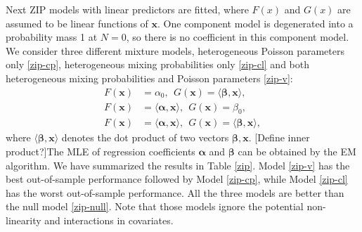 \documentclass[11pt]{article}
\numberwithin{equation}{section}
\def\bx{\boldsymbol{x}}
\begin{document}
Next ZIP models with linear predictors are fitted, where $F(x)$ and $G(x)$ are assumed to be linear functions of $\bx$.
One component model is degenerated into a probability mass 1 at $N=0$, so there is no coefficient in this component model. 
We consider three different mixture models, heterogeneous Poisson parameters only \eqref{zip-cp}, heterogeneous mixing probabilities only \eqref{zip-cl} and both heterogeneous  mixing probabilities and Poisson parameters \eqref{zip-v}:
\begin{align}
	F(\bx)&=\alpha_0, ~~G(\bx)=\langle \boldsymbol{\beta}, \bx\rangle, \label{zip-cp} \\
	F(\bx)&=\langle \boldsymbol{\alpha},\bx\rangle, ~~G(\bx)=\beta_0, \label{zip-cl} \\
	F(\bx)&=\langle \boldsymbol{\alpha},\bx \rangle, ~~G(\bx)=\langle \boldsymbol{\beta}, \bx \rangle, \label{zip-v}
\end{align}  
where $\langle \boldsymbol{\beta}, \bx \rangle$ denotes the dot product of two vectors $\boldsymbol{\beta}, \bx$.
{\color{blue}[Define inner product?]}The MLE of regression coefficients $\boldsymbol{\alpha}$ and $\boldsymbol{\beta}$ can be obtained by the EM algorithm.
We have summarized the results in Table \ref{zip}.
Model \eqref{zip-v} has the best out-of-sample performance followed by Model \eqref{zip-cp}, while Model \eqref{zip-cl} has the worst out-of-sample performance.
All the three models are better than the null model \eqref{zip-null}.
Note that those models ignore the potential non-linearity and interactions in covariates.
\end{document}
